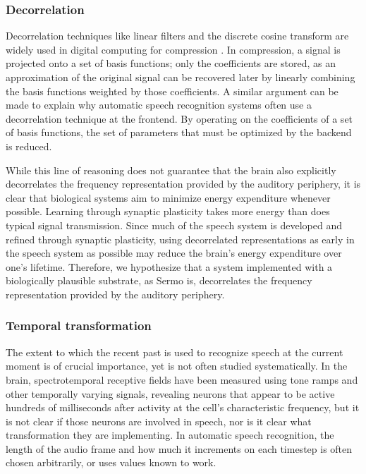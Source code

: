 \subsubsection{Decorrelation}

Decorrelation techniques like
linear filters and the discrete cosine transform
are widely used in digital computing
for compression \cite{khayam2003}.
In compression, a signal is projected
onto a set of basis functions;
only the coefficients are stored,
as an approximation of the original signal
can be recovered later by linearly combining
the basis functions weighted by those coefficients.
A similar argument can be made
to explain why automatic speech recognition systems
often use a decorrelation technique
at the frontend.
By operating on the coefficients of a set
of basis functions,
the set of parameters that must be optimized
by the backend is reduced.

While this line of reasoning
does not guarantee that
the brain also explicitly decorrelates
the frequency representation
provided by the auditory periphery,
it is clear that biological systems
aim to minimize energy expenditure whenever possible.
Learning through synaptic plasticity
takes more energy than does
typical signal transmission.
Since much of the speech system
is developed and refined
through synaptic plasticity,
using decorrelated representations
as early in the speech system as possible
may reduce the brain's energy expenditure
over one's lifetime.
Therefore, we hypothesize
that a system implemented
with a biologically plausible substrate,
as Sermo is,
decorrelates the frequency representation
provided by the auditory periphery.

\subsubsection{Temporal transformation}

The extent to which the recent past
is used to recognize speech
at the current moment
is of crucial importance,
yet is not often studied systematically.
In the brain, spectrotemporal receptive fields
have been measured using
tone ramps and other temporally varying signals,
revealing neurons that appear to be active
hundreds of milliseconds
after activity at
the cell's characteristic frequency,
but it is not clear if those
neurons are involved in speech,
nor is it clear what transformation they are implementing.
In automatic speech recognition,
the length of the audio frame
and how much it increments on each timestep
is often chosen arbitrarily,
or uses values known to work.

